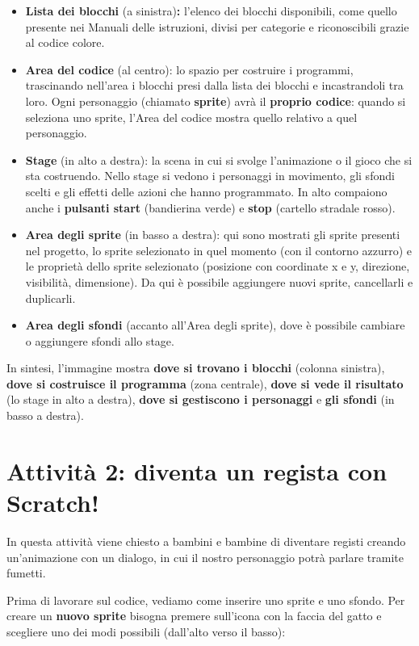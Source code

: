\begin{itemize}
\item
  \textbf{Lista dei blocchi} (a sinistra)\textbf{:} l'elenco dei blocchi disponibili, come quello presente nei Manuali delle istruzioni, divisi per categorie e riconoscibili grazie al codice colore.
\item
  \textbf{Area del codice} (al centro): lo spazio per costruire i programmi, trascinando nell'area i blocchi presi dalla lista dei blocchi e incastrandoli tra loro. Ogni personaggio (chiamato \textbf{sprite}) avrà il \textbf{proprio codice}: quando si seleziona uno sprite, l'Area del codice mostra quello relativo a quel personaggio.
\item
  \textbf{Stage} (in alto a destra): la scena in cui si svolge l'animazione o il gioco che si sta costruendo. Nello stage si vedono i personaggi in movimento, gli sfondi scelti e gli effetti delle azioni che hanno programmato. In alto compaiono anche i \textbf{pulsanti start} (bandierina verde) e \textbf{stop} (cartello stradale rosso).
\item
  \textbf{Area degli sprite} (in basso a destra): qui sono mostrati gli sprite presenti nel progetto, lo sprite selezionato in quel momento (con il contorno azzurro) e le proprietà dello sprite selezionato (posizione con coordinate x e y, direzione, visibilità, dimensione). Da qui è possibile aggiungere nuovi sprite, cancellarli e duplicarli.
\item
  \textbf{Area degli sfondi} (accanto all'Area degli sprite), dove è possibile cambiare o aggiungere sfondi allo stage.
\end{itemize}


In sintesi, l'immagine mostra \textbf{dove si trovano i blocchi} (colonna sinistra), \textbf{dove si costruisce il programma} (zona centrale), \textbf{dove si vede il risultato} (lo stage in alto a destra), \textbf{dove si gestiscono i personaggi} e \textbf{gli sfondi} (in basso a destra).

\section{Attività 2: diventa un regista con Scratch!}

\ruoliattivita{\ruoloProgrammatore}


In questa attività viene chiesto a bambini e bambine di diventare registi creando un'animazione con un dialogo, in cui il nostro personaggio potrà parlare tramite fumetti.

Prima di lavorare sul codice, vediamo come inserire uno sprite e uno sfondo. Per creare un \textbf{nuovo sprite} bisogna premere sull'icona con la faccia del gatto e scegliere uno dei modi possibili (dall'alto verso il basso):

